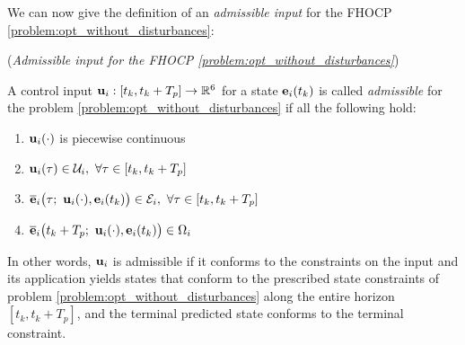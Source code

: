 We can now give the definition of an \textit{admissible input} for the FHOCP
\eqref{problem:opt_without_disturbances}:

\begin{bw_box}
  \begin{definition} (\textit{Admissible input for the FHOCP
\eqref{problem:opt_without_disturbances}})
  \label{definition:admissible_input}

  A control input $\bm{\mathbf{u}}_i : [t_k, t_k + T_p] \to \mathbb{R}^6$ for a state
  $\bm{\mathbf{e}}_i(t_k)$ is called \textit{admissible} for the problem
  \eqref{problem:opt_without_disturbances} if all the following hold:

  \begin{enumerate}
    \item $\bm{\mathbf{u}}_i(\cdot)$ is piecewise continuous
    \item $\vect{u}_i(\tau) \in \mathcal{U}_i,\ \forall \tau \in [t_k, t_k + T_p]$
    \item $\overline{\vect{e}}_i\big(\tau;\ \vect{u}_i(\cdot), \vect{e}_i(t_k)\big) \in \mathcal{E}_i,\ \forall \tau \in [t_k, t_k + T_p]$
    \item $\overline{\vect{e}}_i\big(t_k + T_p;\ \vect{u}_i(\cdot), \vect{e}_i(t_k)\big) \in \Omega_i$
  \end{enumerate}

  In other words, $\bm{\mathbf{u}}_i$ is admissible if it conforms to the constraints
  on the input and its application yields states that conform to the
  prescribed state constraints of problem
  \eqref{problem:opt_without_disturbances} along the entire horizon
  $[t_k, t_k + T_p]$, and the terminal predicted state conforms to the
  terminal constraint.

\end{definition}
\end{bw_box}
